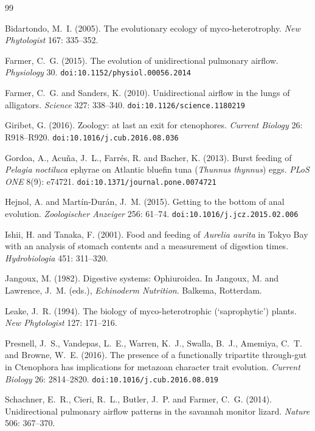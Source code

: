 \documentclass[11pt]{article}
\theoremstyle{plain}
\theoremstyle{definition}
\begin{document}
\begin{thebibliography}{99}

 Bidartondo, M.~I. (2005). The evolutionary ecology of myco-heterotrophy.
\emph{New Phytologist} 167: 335--352.

 Farmer, C.~G. (2015). The evolution of unidirectional pulmonary airflow.
\emph{Physiology} 30. \texttt{doi:10.1152/physiol.00056.2014}

 Farmer, C.~G. and Sanders, K. (2010). Unidirectional airflow in the lungs
of alligators. \emph{Science} 327: 338--340. \texttt{doi:10.1126/science.1180219}

 Giribet, G. (2016). Zoology: at last an exit for ctenophores.
\emph{Current Biology} 26: R918--R920. \texttt{doi:10.1016/j.cub.2016.08.036}

 Gordoa, A., Acu\~na, J.~L., Farr\'es, R. and Bacher, K. (2013). Burst feeding of
\emph{Pelagia noctiluca} ephyrae on Atlantic bluefin tuna (\emph{Thunnus thynnus}) eggs.
\emph{PLoS ONE} 8(9): e74721. \texttt{doi:10.1371/journal.pone.0074721}

 Hejnol, A. and Mart\'in-Dur\'an, J.~M. (2015). Getting to the bottom of anal
evolution. \emph{Zoologischer Anzeiger} 256: 61--74. \texttt{doi:10.1016/j.jcz.2015.02.006}

 Ishii, H. and Tanaka, F. (2001). Food and feeding of \emph{Aurelia aurita} in
Tokyo Bay with an analysis of stomach contents and a measurement of digestion times.
\emph{Hydrobiologia} 451: 311--320.

 Jangoux, M. (1982). Digestive systems: Ophiuroidea. In Jangoux, M. and
Lawrence, J.~M. (eds.), \emph{Echinoderm Nutrition}. Balkema, Rotterdam.

 Leake, J.~R. (1994). The biology of myco-heterotrophic (`saprophytic') plants.
\emph{New Phytologist} 127: 171--216.

 Presnell, J.~S., Vandepas, L.~E., Warren, K.~J., Swalla, B.~J., Amemiya, C.~T.
and Browne, W.~E. (2016). The presence of a functionally tripartite through-gut in Ctenophora has
implications for metazoan character trait evolution. \emph{Current Biology} 26: 2814--2820.
\texttt{doi:10.1016/j.cub.2016.08.019}

 Schachner, E.~R., Cieri, R.~L., Butler, J.~P. and Farmer, C.~G. (2014).
Unidirectional pulmonary airflow patterns in the savannah monitor lizard. \emph{Nature} 506: 367--370.

\end{thebibliography}
\end{document}
